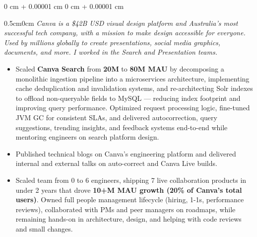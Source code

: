 \documentclass[10pt, letterpaper]{article}
\newenvironment{highlights}{
    \begin{itemize}[
        topsep=0.10 cm,
        parsep=0.10 cm,
        partopsep=0pt,
        itemsep=0pt,
        leftmargin=0 cm + 10pt
    ]
}{
    \end{itemize}
} %
\newenvironment{onecolentry}{
    \begin{adjustwidth}{
        0 cm + 0.00001 cm
    }{
        0 cm + 0.00001 cm
    }
}{
    \end{adjustwidth}
} %
\begin{document}
        \vspace{0.10 cm}
        \begin{onecolentry}
            \begin{adjustwidth}{0.5cm}{0cm}
            \textit{Canva is a \$42B USD visual design platform and Australia's most successful tech company, with a mission to make design accessible for everyone. Used by millions globally to create presentations, social media graphics, documents, and more. I worked in the Search and Presentation teams.}
            \end{adjustwidth}
            
            \vspace{0.10 cm}
            \begin{highlights}
                \item Scaled \textbf{Canva Search} from \textbf{20M} to \textbf{80M MAU} by decomposing a monolithic ingestion pipeline into a microservices architecture, implementing cache deduplication and invalidation systems, and re-architecting Solr indexes to offload non-queryable fields to MySQL — reducing index footprint and improving query performance. Optimized request processing logic, fine-tuned JVM GC for consistent SLAs, and delivered autocorrection, query suggestions, trending insights, and feedback systems end-to-end while mentoring engineers on search platform design.
                \item Published technical blogs on Canva's engineering platform and delivered internal and external talks on auto-correct and Canva Live builds.
                \item Scaled team from 0 to 6 engineers, shipping 7 live collaboration products in under 2 years that drove \textbf{10+M MAU growth (20\% of Canva's total users)}. Owned full people management lifecycle (hiring, 1-1s, performance reviews), collaborated with PMs and peer managers on roadmaps, while remaining hands-on in architecture, design, and helping with code reviews and small changes.
            \end{highlights}
        \end{onecolentry}
\end{document}
